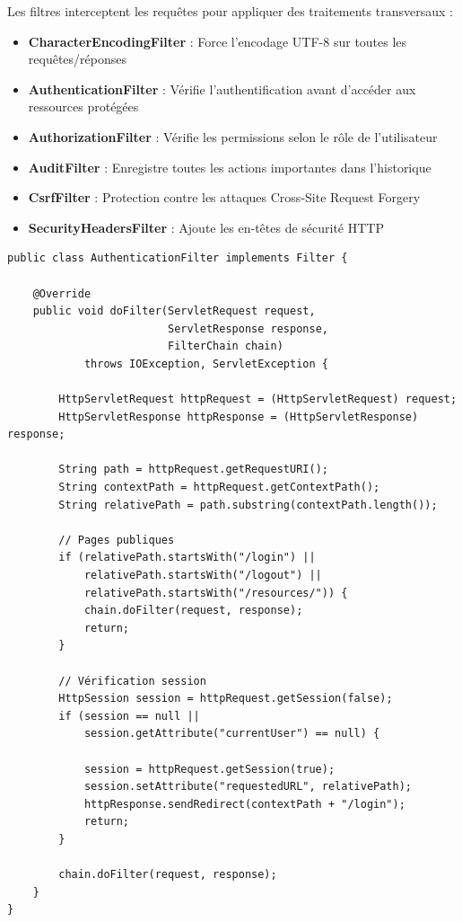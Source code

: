 \documentclass[12pt,a4paper,twoside]{report}
\begin{document}
Les filtres interceptent les requêtes pour appliquer des traitements transversaux :

\begin{itemize}
    \item \textbf{CharacterEncodingFilter} : Force l'encodage UTF-8 sur toutes les requêtes/réponses
    \item \textbf{AuthenticationFilter} : Vérifie l'authentification avant d'accéder aux ressources protégées
    \item \textbf{AuthorizationFilter} : Vérifie les permissions selon le rôle de l'utilisateur
    \item \textbf{AuditFilter} : Enregistre toutes les actions importantes dans l'historique
    \item \textbf{CsrfFilter} : Protection contre les attaques Cross-Site Request Forgery
    \item \textbf{SecurityHeadersFilter} : Ajoute les en-têtes de sécurité HTTP
\end{itemize}

\begin{lstlisting}[caption=Filtre d'authentification, label=lst:auth-filter]
public class AuthenticationFilter implements Filter {
    
    @Override
    public void doFilter(ServletRequest request, 
                         ServletResponse response, 
                         FilterChain chain) 
            throws IOException, ServletException {
        
        HttpServletRequest httpRequest = (HttpServletRequest) request;
        HttpServletResponse httpResponse = (HttpServletResponse) response;
        
        String path = httpRequest.getRequestURI();
        String contextPath = httpRequest.getContextPath();
        String relativePath = path.substring(contextPath.length());
        
        // Pages publiques
        if (relativePath.startsWith("/login") || 
            relativePath.startsWith("/logout") ||
            relativePath.startsWith("/resources/")) {
            chain.doFilter(request, response);
            return;
        }
        
        // Vérification session
        HttpSession session = httpRequest.getSession(false);
        if (session == null || 
            session.getAttribute("currentUser") == null) {
            
            session = httpRequest.getSession(true);
            session.setAttribute("requestedURL", relativePath);
            httpResponse.sendRedirect(contextPath + "/login");
            return;
        }
        
        chain.doFilter(request, response);
    }
}
\end{lstlisting}
\end{document}
